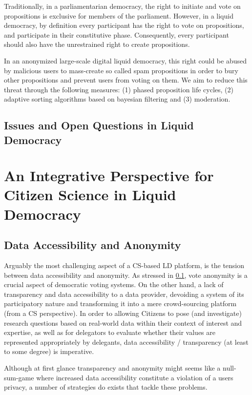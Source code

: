 Traditionally, in a parliamentarian democracy, the right to initiate and vote on propositions is exclusive for members of the parliament.
However, in a liquid democracy, by definition every participant has the right to vote on propositions, and participate in their constitutive phase.
Consequently, every participant should also have the unrestrained right to create propositions.

In an anonymized large-scale digital liquid democracy, this right could be abused by malicious users to mass-create so called spam propositions in order to bury other propositions and prevent users from voting on them.
We aim to reduce this threat through the following measures: (1) phased proposition life cycles, (2) adaptive sorting algorithms based on bayesian filtering and (3) moderation.


\subsection{Issues and Open Questions in Liquid Democracy}
\label{ssec:Issues_LD}
\section{An Integrative Perspective for Citizen Science in Liquid Democracy}
\label{sec:Integration_CSLD}

\subsection{Data Accessibility and Anonymity}
\label{ssec:Integration_AccessibilityAnonymity}
Arguably the most challenging aspect of a CS-based LD platform, is the tension between data accessibility and anonymity. As stressed  in \ref{ssec:Issues_LD}, vote anonymity is a crucial aspect of democratic voting systems. On the other hand, a lack of transparency and data accessibility  to a data provider, devoiding a system of its participatory nature and transforming it into a mere crowd-sourcing platform (from a CS perspective). In order to allowing Citizens to pose (and investigate) research questions based on real-world data within their context of interest and expertise, as well as for delegators to evaluate whether their values are represented appropriately by delegants, data accessibility / transparency (at least to some degree) is imperative.

Although at first glance transparency and anonymity might seems like a null-sum-game where increased data accessibility constitute a violation of a users privacy, a number of strategies do exists that tackle these problems.

